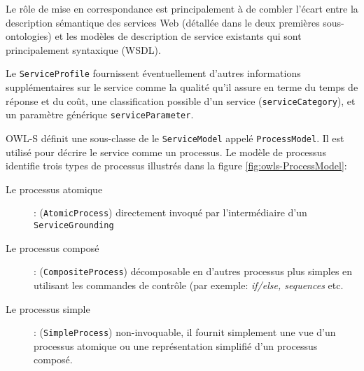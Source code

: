 \begin{description}
      Le rôle de mise en correspondance est principalement à de
      combler l'écart entre la description sémantique des services Web
      (détallée dans le deux premières sous-ontologies) et les
      modèles de description de service existants qui sont
      principalement syntaxique (\textsc{WSDL}).
    \end{description}

    Le \verb|ServiceProfile| fournissent éventuellement d'autres
    informations supplémentaires sur le service comme la qualité qu'il
    assure en terme du temps de réponse et du coût, une classification
    possible d'un service (\verb|serviceCategory|), et un paramètre
    générique \verb|serviceParameter|.

     \newpage 

    \textsc{OWL-S} définit une sous-classe de le \verb|ServiceModel|
    appelé \verb|ProcessModel|. Il est utilisé pour décrire le service
    comme un processus. Le modèle de processus identifie trois types
    de processus illustrés dans la figure \ref{fig:owls-ProcessModel}:

    \SpecialItem
    \begin{description}
    \item[Le processus atomique]: (\verb|AtomicProcess|) directement
      invoqué par l'intermédiaire d'un \verb|ServiceGrounding|
      
    \item[Le processus composé]: (\verb|CompositeProcess|)
      décomposable en d'autres processus plus simples en utilisant les
      commandes de contrôle (par exemple: \textit{if/else, sequences}
      etc.
        
    \item[Le processus simple]: (\verb|SimpleProcess|) non-invoquable,
      il fournit simplement une vue d'un processus atomique ou une
      représentation simplifié d’un processus composé.
    \end{description}


